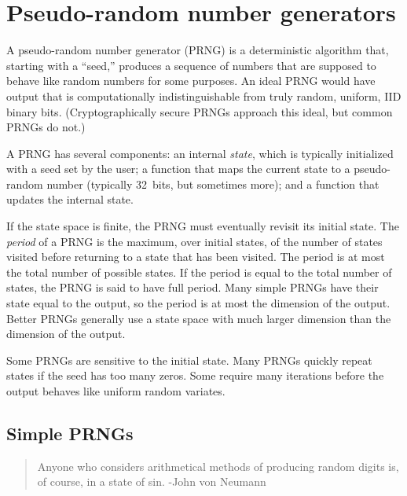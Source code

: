 \documentclass[graybox]{svmult}
\begin{document}
\section{Pseudo-random number generators}
\label{sec:prngs}

A pseudo-random number generator (PRNG) is a deterministic algorithm that, starting with
a ``seed,'' produces a sequence of numbers that are supposed to behave like random numbers
for some purposes.
An ideal PRNG would have output that is computationally indistinguishable from truly random, uniform, IID 
binary bits. 
(Cryptographically secure PRNGs approach this ideal, but common PRNGs do not.)

A PRNG has several components:
an internal \emph{state}, which is typically initialized with a seed set by the user;
a function that maps the current state to a pseudo-random number (typically 32~bits, but sometimes more);
and a function that updates the internal state.

If the state space is finite, the PRNG must eventually revisit its initial state.
The \emph{period} of a PRNG is the maximum, over initial states, of the number of states 
visited before returning to a state that has been visited.
The period is at most the total number of possible states.
If the period is equal to the total number of states, the PRNG is said to have full period.
Many simple PRNGs have their state equal to the output, so the period is at most the dimension of the output.
Better PRNGs generally use a state space with much larger dimension than the dimension of the output.

Some PRNGs are sensitive to the initial state.
Many PRNGs quickly repeat states if the seed has too many zeros.
Some require many iterations before the output behaves like uniform random variates.


\subsection{Simple PRNGs}

\begin{quotation}
Anyone who considers arithmetical methods of producing random digits is, of course, in a state of sin.  -John von Neumann
\end{quotation}
\end{document}
